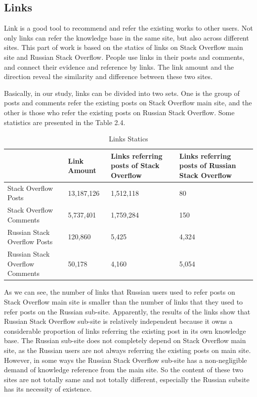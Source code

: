 \subsection{Links}
Link is a good tool to recommend and refer the existing works to other users. Not only links can refer the knowledge base in the same site, but also across different sites. This part of work is based on the statics of links on Stack Overflow main site and Russian Stack Overflow. People use links in their posts and comments, and connect their evidence and reference by links. The link amount and the direction reveal the similarity and difference between these two sites.
\par
Basically, in our study, links can be divided into two sets. One is the group of posts and comments refer the existing posts on Stack Overflow main site, and the other is those who refer the existing posts on Russian Stack Overflow. Some statistics are presented in the Table 2.4.
\begin{table}[!h]
	\caption{Links Statics}
	\centering
	\label{tab:table5}
	\begin{tabular}{|p{6cm}|p{3.5cm}|p{2.5cm}|p{2.5cm}|}
\hline
		 &Link Amount &Links referring posts of Stack Overflow&Links referring posts of Russian Stack Overflow\\
		\hline
		Stack Overflow Posts &13,187,126&1,512,118&80 \\
\hline	
		Stack Overflow Comments &5,737,401&1,759,284& 150\\
\hline		
		Russian Stack Overflow Posts &120,860&5,425&4,324 \\
\hline
		Russian Stack Overflow Comments &50,178&4,160&5,054 \\
\hline
	\end{tabular}

\end{table}	
\par
As we can see, the number of links that Russian users used to refer posts on Stack Overflow main site is smaller than the number of links that they used to refer posts on the Russian sub-site. Apparently, the results of the links show that Russian Stack Overflow sub-site is relatively independent because it owns a considerable proportion of links referring the existing post in its own knowledge base. The Russian sub-site does not completely depend on Stack Overflow main site, as the Russian users are not always referring the existing posts on main site. However, in some ways the Russian Stack Overflow sub-site has a non-negligible demand of knowledge reference from the main site. So the content of these two sites are not totally same and not totally different, especially the Russian subsite has its necessity of existence.

